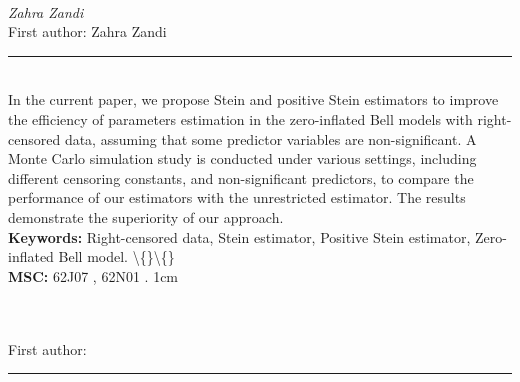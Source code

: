 \documentclass[10pt,twoside]{article}
\begin{document}
\noindent\begin{minipage}[t][\textheight]{\textwidth}
\\[0.35em]
{\itshape Zahra Zandi}\\[0.2em]
{\footnotesize First author: Zahra Zandi}\\[0.45em]
\noindent\rule{\textwidth}{0.3pt}\\[0.4em]
{\footnotesize  In the current paper, we propose Stein and positive Stein estimators to improve the efficiency of parameters estimation in the zero-inflated Bell models with right-censored data, assuming that some predictor variables are non-significant. A Monte Carlo simulation study is conducted under various settings, including different censoring constants, and non-significant predictors, to compare the performance of our estimators with the unrestricted estimator. The results demonstrate the superiority of our approach.}\\[0.4em]
{\footnotesize\bfseries Keywords:} {\footnotesize Right-censored data, Stein estimator, Positive Stein estimator, Zero-inflated Bell model. \textbackslash\{\}\textbackslash\{\}}\\[0.15em]
{\footnotesize\bfseries MSC:} {\footnotesize 62J07 , 62N01 . 1cm}\\
\vfill
\end{minipage}
\newpage

\noindent\begin{minipage}[t][\textheight]{\textwidth}
\\[0.35em]
{\itshape }\\[0.2em]
{\footnotesize First author: }\\[0.45em]
\noindent\rule{\textwidth}{0.3pt}\\[0.4em]
{\footnotesize }\\[0.4em]
\vfill
\end{minipage}
\newpage
\end{document}
